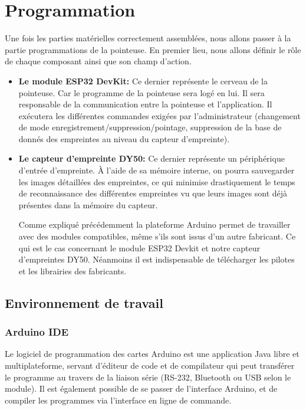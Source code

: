 \section{Programmation}
Une fois les parties matérielles correctement assemblées, nous allons passer à 
la partie programmations de la pointeuse. En premier lieu, nous allons définir 
le rôle de chaque composant ainsi que son champ d’action.

\begin{itemize}
    \item[\textbullet] \textbf{Le module ESP32 DevKit:} Ce dernier représente le
        cerveau de la pointeuse. Car le programme de la pointeuse sera logé en
        lui. Il sera responsable de la communication entre la pointeuse et
        l’application. Il exécutera les différentes commandes exigées par
        l’administrateur (changement de mode
        enregistrement/suppression/pointage, suppression de la base de donnés
        des empreintes au niveau du capteur d’empreinte).  
    \item[\textbullet] \textbf{Le capteur d'empreinte DY50:} Ce dernier
        représente un périphérique d’entrée d’empreinte. À l’aide de sa mémoire
        interne, on pourra sauvegarder les images détaillées des empreintes, ce
        qui minimise drastiquement le temps de reconnaissance des différentes
        empreintes vu que leurs images sont déjà présentes dans la mémoire du
        capteur.

        Comme expliqué précédemment la plateforme Arduino permet de travailler
        avec des modules compatibles, même s’ils sont issus d’un autre
        fabricant. Ce qui est le cas concernant le module ESP32 Devkit et notre
        capteur d’empreintes DY50.  Néanmoins il est indispensable de
        télécharger les pilotes et les librairies des fabricants.    
\end{itemize}

\subsection{Environnement de travail}

\subsubsection{Arduino IDE }
Le logiciel de programmation des cartes Arduino est une application Java libre 
et multiplateforme, servant d'éditeur de code et de compilateur qui peut 
transférer le programme au travers de la liaison série (RS-232, Bluetooth ou USB 
selon le module). Il est également possible de se passer de l'interface Arduino, 
et de compiler les programmes via l'interface en ligne de commande.

